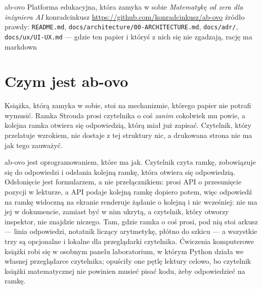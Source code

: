 \documentclass[11pt,a4paper]{article}
\begin{document}
\housetitle
    {ab-ovo}
    {Platforma edukacyjna, która zamyka w sobie \emph{Matematykę od zera dla inżyniera AI}}
    {konradcinkusz}
    {\url{https://github.com/konradcinkusz/ab-ovo}}
    {źródło prawdy: \texttt{README.md}, \texttt{docs/architecture/00-ARCHITECTURE.md},
     \texttt{docs/adr/}, \texttt{docs/ux/UI-UX.md} --- gdzie ten papier i któryś z nich
     się nie zgadzają, rację ma markdown}

\begin{abstract}
\noindent
ab-ovo to platforma edukacyjna zbudowana wokół książki złożonej z 47 programów nauczania
programowanego, po angielsku i po polsku, wraz z ćwiczeniami komputerowymi tej książki. Ten
dokument jest przeglądem projektu: czym system jest, czym celowo nie jest, co istnieje dziś w
repozytorium i co jest planowane. Nie jest artykułem naukowym i nie podaje żadnego wyniku.
Każde zdanie w nim pochodzi z dokumentacji markdown repozytorium, która jest źródłem prawdy;
gdy oba się nie zgadzają, rację ma markdown. Rysunki są własnymi diagramami repozytorium,
wyrenderowanymi z tych samych źródeł, które renderuje GitHub.
\end{abstract}

\section{Czym jest ab-ovo}

Książka, którą zamyka w sobie, stoi na mechanizmie, którego papier nie potrafi wymusić. Ramka
Strouda prosi czytelnika o coś \emph{zanim} cokolwiek mu powie, a kolejna ramka otwiera się
odpowiedzią, którą miał już zapisać. Czytelnik, który przelatuje wzrokiem, nie dostaje z tej
struktury nic, a drukowana strona nie ma jak tego zauważyć.

ab-ovo jest oprogramowaniem, które ma jak. Czytelnik czyta ramkę, zobowiązuje się do odpowiedzi
i odsłania kolejną ramkę, która otwiera się odpowiedzią. Odsłonięcie jest formularzem, a nie
przełącznikiem: prosi API o przesunięcie pozycji w lekturze, a API podaje kolejną ramkę dopiero
potem, więc odpowiedź na ramkę widoczną na ekranie renderuje żądanie o kolejną i nic wcześniej:
nie ma jej w dokumencie, zamiast być w nim ukrytą, a czytelnik, który otworzy inspektor, nie
znajdzie niczego. Tam, gdzie ramka o coś prosi, pod nią stoi arkusz --- linia odpowiedzi,
notatnik liczący arytmetykę, płótno do szkicu --- a wszystkie trzy są opcjonalne i lokalne dla
przeglądarki czytelnika. Ćwiczenia komputerowe książki robi się w osobnym panelu laboratorium,
w którym Python działa we własnej przeglądarce czytelnika; opuściły one pętlę lektury celowo,
bo czytelnik książki matematycznej nie powinien musieć pisać kodu, żeby odpowiedzieć na ramkę.
\end{document}
